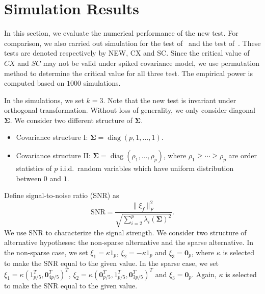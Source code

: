 \documentclass[12pt]{article} %
\DeclareMathOperator{\mytr}{tr}
\DeclareMathOperator{\mydiag}{diag}
\newcommand{\bfsym}[1]{\ensuremath{\boldsymbol{#1}}}
\def\bSigma {\bfsym {\Sigma}}
\theoremstyle{definition}
\begin{document}




\section{Simulation Results}

In this section, we evaluate the numerical performance of the new test. For comparison, we also carried out simulation for the test of~\citet{Cai2014High} and the test of~\citet{Schott2007Some}.
These tests are denoted respectively by NEW, CX and SC.
Since the critical value of $CX$ and $SC$ may not be valid under spiked covariance model, we use permutation method to determine the critical value for all three test.
The empirical power is computed based on $1000$ simulations.

In the simulations, we set $k=3$.
Note that the new test is invariant under orthogonal transformation.
Without loss of generality, we only consider diagonal $\bSigma$.
We consider two different structure of $\bSigma$.
\begin{itemize}
    \item
        Covariance structure I: $\bSigma=\mydiag(p,1,\ldots,1)$.
    \item
        Covariance structure II: $\bSigma=\mydiag(\rho_1,\ldots,\rho_p)$, where $\rho_1\geq \cdots\geq \rho_p$ are order statistics of $p$ i.i.d.\ random variables which have uniform distribution between $0$ and $1$.
\end{itemize}

Define signal-to-noise ratio (SNR) as
$$
\textrm{SNR}=\frac{\|\xi_f\|_F^2}{\sqrt{\sum_{i=2}^{p}\lambda_i(\bSigma)^2}}.
$$
We use SNR to characterize the signal strength.
We consider two structure of alternative hypotheses: the non-sparse alternative and the sparse alternative.
In the non-sparse case, we set $\xi_1=\kappa 1_p$, $\xi_2=-\kappa 1_p$ and $\xi_3=\mathbf{0}_p$, where $\kappa$ is selected to make the SNR equal to the given value.
In the sparse case, we set $\xi_1=\kappa (1_{p/5}^T,\mathbf{0}_{4p/5}^T)^T$, $\xi_2=\kappa (\mathbf{0}_{p/5}^T, 1_{p/5}^T,\mathbf{0}_{3p/5}^T)^T$ and $\xi_3=\mathbf{0}_p$. Again, $\kappa$ is selected to make the SNR equal to the given value.
\end{document}
